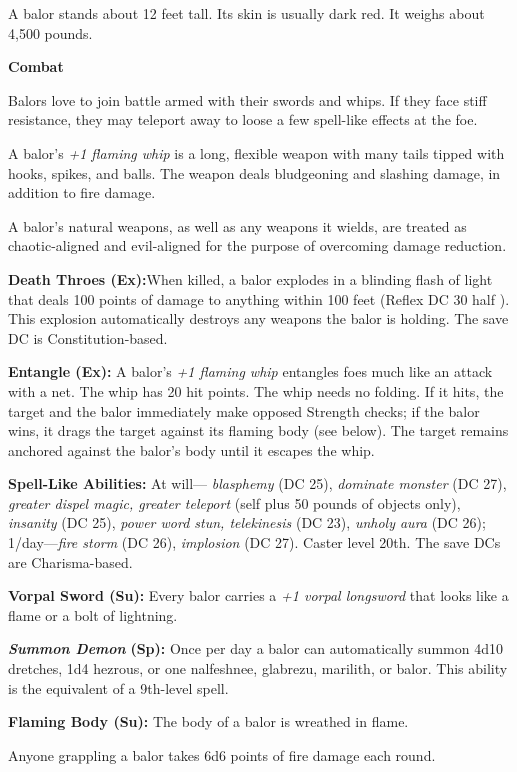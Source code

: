 \documentclass{article}
\begin{document}
A balor stands about 12 feet tall. Its skin is usually dark red. It weighs about 
4,500 pounds.

\textbf{Combat}

Balors love to join battle armed with their swords and whips. If they face stiff 
resistance, they may teleport away to loose a few spell-like effects at the foe.

A balor's \textit{+1 flaming whip }is a long, flexible weapon with many tails tipped 
with hooks, spikes, and balls. The weapon deals bludgeoning and slashing damage, 
in addition to fire damage.

A balor's natural weapons, as well as any weapons it wields, are treated as chaotic-aligned 
and evil-aligned for the purpose of overcoming damage reduction.

\textbf{Death Throes (Ex):}When killed, a balor explodes in a blinding flash of 
light that deals 100 points of damage to anything within 100 feet (Reflex DC 30 
half ). This explosion automatically destroys any weapons the balor is holding. 
The save DC is Constitution-based.

\textbf{Entangle (Ex):} A balor's \textit{+1 flaming whip }entangles foes much 
like an attack with a net. The whip has 20 hit points. The whip needs no folding. 
If it hits, the target and the balor immediately make opposed Strength checks; 
if the balor wins, it drags the target against its flaming body (see below). The 
target remains anchored against the balor's body until it escapes the whip.

\textbf{Spell-Like Abilities:} At will--- \textit{blasphemy }(DC 25), \textit{dominate 
monster }(DC 27), \textit{greater dispel magic, greater teleport }(self plus 50 
pounds of objects only), \textit{insanity }(DC 25), \textit{power word stun, telekinesis 
}(DC 23), \textit{unholy aura }(DC 26); 1/day---\textit{fire storm }(DC 26), \textit{implosion 
}(DC 27). Caster level 20th. The save DCs are Charisma-based.

\textbf{Vorpal Sword (Su):} Every balor carries a \textit{+1 vorpal longsword }that 
looks like a flame or a bolt of lightning.

\textit{\textbf{Summon Demon }}\textbf{(Sp):} Once per day a balor can automatically 
summon 4d10 dretches, 1d4 hezrous, or one nalfeshnee, glabrezu, marilith, or balor. 
This ability is the equivalent of a 9th-level spell.

\textbf{Flaming Body (Su):} The body of a balor is wreathed in flame. 

Anyone grappling a balor takes 6d6 points of fire damage each round.
\end{document}
